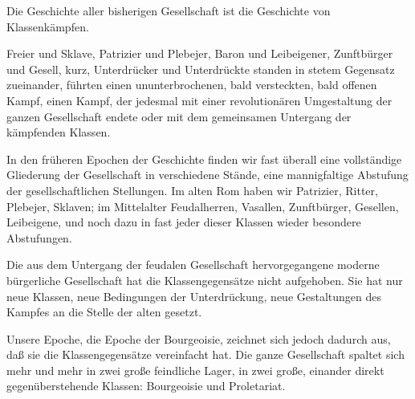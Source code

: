 \documentclass[letterpaper]{article}
\begin{document}
Die Geschichte aller bisherigen Gesellschaft ist die Geschichte von Klassenkämpfen.

Freier und Sklave, Patrizier und Plebejer, Baron und Leibeigener, Zunftbürger und Gesell, kurz, Unterdrücker und Unterdrückte standen in stetem Gegensatz zueinander, führten einen ununterbrochenen, bald versteckten, bald offenen Kampf, einen Kampf, der jedesmal mit einer revolutionären Umgestaltung der ganzen Gesellschaft endete oder mit dem gemeinsamen Untergang der kämpfenden Klassen.

In den früheren Epochen der Geschichte finden wir fast überall eine vollständige Gliederung der Gesellschaft in verschiedene Stände, eine mannigfaltige Abstufung der gesellschaftlichen Stellungen. Im alten Rom haben wir Patrizier, Ritter, Plebejer, Sklaven; im Mittelalter Feudalherren, Vasallen, Zunftbürger, Gesellen, Leibeigene, und noch dazu in fast jeder dieser Klassen wieder besondere Abstufungen.

Die aus dem Untergang der feudalen Gesellschaft hervorgegangene moderne bürgerliche Gesellschaft hat die Klassengegensätze nicht aufgehoben. Sie hat nur neue Klassen, neue Bedingungen der Unterdrückung, neue Gestaltungen des Kampfes an die Stelle der alten gesetzt.

Unsere Epoche, die Epoche der Bourgeoisie, zeichnet sich jedoch dadurch aus, daß sie die Klassengegensätze vereinfacht hat. Die ganze Gesellschaft spaltet sich mehr und mehr in zwei große feindliche Lager, in zwei große, einander direkt gegenüberstehende Klassen: Bourgeoisie und Proletariat.
\end{document}
